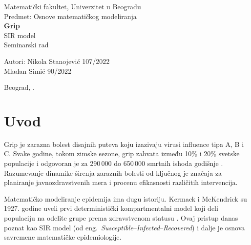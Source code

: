 \documentclass[12pt,a4paper]{article}
\begin{document}
	
	\begin{titlepage}
		\centering
		\vspace*{1.5cm}
		{\large Matematički fakultet, Univerzitet u Beogradu}\\[0.3cm]
		{\large Predmet: Osnove matematičkog modeliranja}\\[2cm]
		{\Huge\bfseries Grip}\\[0.5cm]
		{\Large SIR model}\\[2cm]
		{\large Seminarski rad}\\[3.5cm]
		\begin{flushright}
			{\large Autori: Nikola Stanojević 107/2022}\\[0.8cm]
			{\large Mlađan Simić 90/2022}\\[0.8cm]
		\end{flushright}
		\vfill
		{\large Beograd, \the\year.}
	\end{titlepage}
	
	\tableofcontents
	\newpage
	
	\section{Uvod}
	
	Grip je zarazna bolest disajnih puteva koju izazivaju virusi influence tipa A, B i C.
	Svake godine, tokom zimske sezone, grip zahvata između 10\% i 20\% svetske populacije i odgovoran
	je za 290\,000 do 650\,000 smrtnih ishoda godišnje \cite{WHO2019}. Razumevanje dinamike širenja
	zaraznih bolesti od ključnog je značaja za planiranje javnozdravstvenih mera i procenu efikasnosti
	različitih intervencija.
	
	Matematičko modeliranje epidemija ima dugu istoriju. Kermack i McKendrick su 1927. godine uveli
	prvi deterministički kompartmentalni model koji deli populaciju na odelite grupe prema zdravstvenom
	statusu \cite{Kermack1927}. Ovaj pristup danas poznat kao SIR model (od eng.\ 
	\textit{Susceptible}--\textit{Infected}--\textit{Recovered}) i dalje je osnova savremene 
	matematičke epidemiologije.
	
\end{document}
